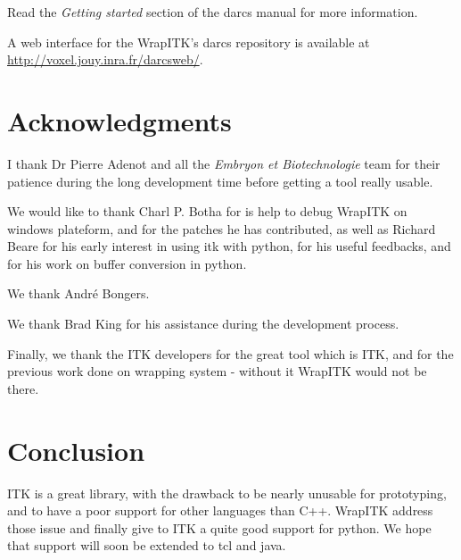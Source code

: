 \documentclass{InsightArticle}
\begin{document}
Read the {\em Getting started} section of the darcs manual \cite{DarcsWebSite}
for more information.

A web interface \cite{DarcswebWebSite} for the WrapITK's darcs
repository is available at \url{http://voxel.jouy.inra.fr/darcsweb/}.


\section{Acknowledgments}
I thank Dr Pierre Adenot and all the {\em Embryon et Biotechnologie} team for their
patience during the long development time before getting a tool really usable.

We would like to thank Charl P. Botha for is help to debug WrapITK on windows
plateform, and for the patches he has contributed, as well as Richard Beare for
his early interest in using itk with python, for his useful feedbacks, and for
his work on buffer conversion in python.

We thank Andr\'e Bongers.

We thank Brad King for his assistance during the development process.

Finally, we thank the ITK developers for the great tool which is ITK, and for the
previous work done on wrapping system - without it WrapITK would not be there.


\section{Conclusion}

ITK is a great library, with the drawback to be nearly unusable for prototyping,
and to have a poor support for other languages than C++. WrapITK address those
issue and finally give to ITK a quite good support for python. We hope that support
will soon be extended to tcl and java.



\appendix





\nocite{ITKSoftwareGuide}
\end{document}
